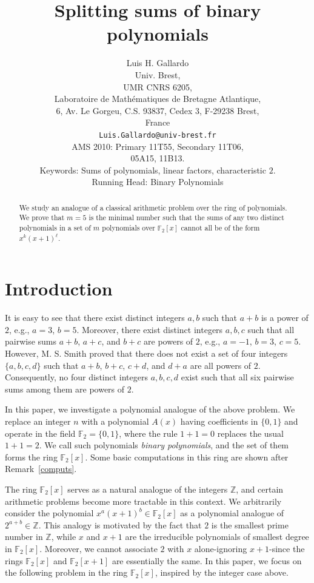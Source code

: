 \documentclass[12pt, reqno]{article}
\author{Luis H. Gallardo \\
Univ. Brest, \\
UMR CNRS 6205, \\
Laboratoire de Math\'ematiques de Bretagne Atlantique,\\
6, Av. Le Gorgeu, C.S. 93837, Cedex 3, F-29238 Brest, \\
France \\
{\tt Luis.Gallardo@univ-brest.fr}\\
 AMS 2010: Primary 11T55, Secondary 11T06,\\
  05A15, 11B13.\\
Keywords: Sums of polynomials, linear factors, characteristic $2$.\\
Running Head: Binary Polynomials}
\title{Splitting sums of binary polynomials}
\theoremstyle{plain}
\theoremstyle{definition}
\theoremstyle{remark}
\def\Z{\mathbb{Z}}
\def\F{\mathbb{F}}
\begin{document}
\maketitle

\begin{abstract}
We study an analogue of a classical arithmetic problem over the ring of polynomials. We prove that $m = 5$ is the minimal number such that the sums of any two distinct polynomials in a set of $m$ polynomials over $\F_2[x]$ cannot all be of the form $x^k(x+1)^{\ell}$.
\end{abstract}

\newpage

\section{Introduction}



It is easy to see that there exist distinct integers $a, b$ such that $a + b$ is a power of $2$, e.g., $a = 3$, $b = 5$. Moreover, there exist distinct integers $a, b, c$ such that all pairwise sums $a + b$, $a + c$, and $b + c$ are powers of $2$, e.g., $a = -1$, $b = 3$, $c = 5$. However, M. S. Smith \cite[sequence A352178]{oeis} proved that there does not exist a set of four integers $\{a, b, c, d\}$ such that $a + b$, $b + c$, $c + d$, and $d + a$ are all powers of $2$. Consequently, no four distinct integers $a, b, c, d$ exist such that all six pairwise sums among them are powers of $2$.

In this paper, we investigate a polynomial analogue of the above problem. We replace an integer $n$ with a polynomial $A(x)$ having coefficients in $\{0,1\}$ and operate in the field $\F_2 = \{0,1\}$, where the rule $1+1 = 0$ replaces the usual $1+1 = 2$. We call such polynomials \emph{binary polynomials}, and the set of them forms the ring $\F_2[x]$. Some basic computations in this ring are shown after Remark~\ref{computs}.
 
The ring $\F_2[x]$ serves as a natural analogue of the integers $\Z$, and certain arithmetic problems become more tractable in this context. We arbitrarily consider the polynomial $x^a(x+1)^b \in \F_2[x]$ as a polynomial analogue of $2^{a+b} \in \Z$. This analogy is motivated by the fact that $2$ is the smallest prime number in $\Z$, while $x$ and $x+1$ are the irreducible polynomials of smallest degree in $\F_2[x]$. Moreover, we cannot associate $2$ with $x$ alone-ignoring $x+1$-since the rings $\F_2[x]$ and $\F_2[x+1]$ are essentially the same. 
In this paper, we focus on the following problem in the ring $\F_2[x]$, inspired by the integer case above.
\end{document}
